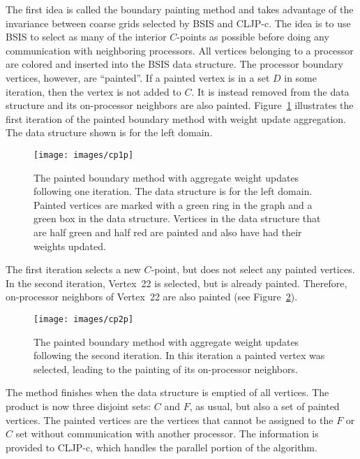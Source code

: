 \documentclass{elsart}
\begin{document}
The first idea is called the boundary painting method and takes
advantage of the invariance between coarse grids selected by BSIS and
CLJP-c. The idea is to use BSIS to select as many of the interior
$C$-points as possible before doing any communication with neighboring
processors. All vertices belonging to a processor are colored and
inserted into the BSIS data structure. The processor boundary
vertices, however, are ``painted''. If a painted vertex is in a set
$D$ in some iteration, then the vertex is not added to $C$. It is
instead removed from the data structure and its on-processor neighbors
are also painted. Figure~\ref{5:fig:cp1-parallel} illustrates the
first iteration of the painted boundary method with weight update
aggregation. The data structure shown is for the left domain.
\begin{figure}
  \begin{center}
    \texttt{[image: images/cp1p]}
    \caption{The painted boundary method with aggregate weight
    updates following one iteration. The data structure is for the
    left domain. Painted vertices are marked with a green ring in the
    graph and a green box in the data structure. Vertices in the data
    structure that are half green and half red are painted and also
    have had their weights updated.}
    \label{5:fig:cp1-parallel}
  \end{center}
\end{figure}
The first iteration selects a new $C$-point, but does not select any
painted vertices. In the second iteration, Vertex~22 is selected, but
is already painted. Therefore, on-processor neighbors of Vertex~22 are
also painted (see Figure~\ref{5:fig:cp2-parallel}).
\begin{figure}
  \begin{center}
    \texttt{[image: images/cp2p]}
    \caption{The painted boundary method with aggregate weight
    updates following the second iteration. In this iteration a
    painted vertex was selected, leading to the painting of its
    on-processor neighbors.}
    \label{5:fig:cp2-parallel}
  \end{center}
\end{figure}
The method finishes when the data structure is emptied of all
vertices. The product is now three disjoint sets: $C$ and $F$, as
usual, but also a set of painted vertices. The painted vertices are
the vertices that cannot be assigned to the $F$ or $C$ set without
communication with another processor. The information is provided to
CLJP-c, which handles the parallel portion of the algorithm.
\end{document}
